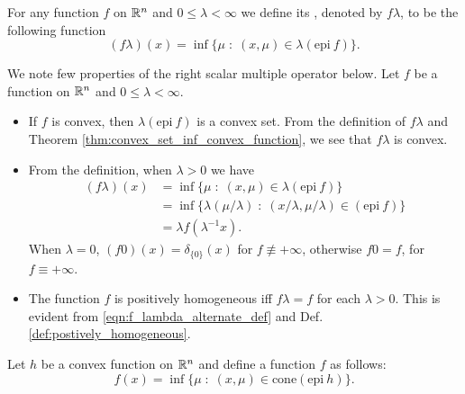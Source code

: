 \documentclass[11pt,a4paper]{article}
\begin{document}
\begin{definition}
    For any function $f$ on $\mathbb{R}^n$ and $0\le\lambda<\infty$ we define its , denoted by $f\lambda$, to be the following function
    \begin{equation*}
        (f\lambda)(x) = \inf\{\mu\;:\;(x,\mu)\in \lambda (\text{epi}\ f)\}.
    \end{equation*}
\end{definition}

\begin{remark}
    We note few properties of the right scalar multiple operator below. Let $f$ be a function on $\mathbb{R}^n$ and $0\le\lambda<\infty$.
    \begin{itemize}
        \item If $f$ is convex, then $\lambda(\text{epi}\ f)$ is a convex set. From the definition of $f\lambda$ and Theorem \ref{thm:convex_set_inf_convex_function}, we see that $f\lambda$ is convex. 
        \item From the definition, when $\lambda>0$ we have
        \begin{align}
            (f\lambda)(x) &= \inf\{\mu\;:\;(x,\mu)\in \lambda (\text{epi}\ f)\} \nonumber\\
            &= \inf\{\lambda (\mu/\lambda)\;:\;(x/\lambda,\mu/\lambda)\in (\text{epi}\ f)\}\nonumber\\
            &= \lambda f(\lambda^{-1}x).\label{eqn:f_lambda_alternate_def}
        \end{align}
        When $\lambda = 0$, $(f0)(x) = \delta_{\{0\}}(x)$ for $f\not\equiv +\infty$, otherwise $f0 = f$, for $f\equiv +\infty$.
        \item The function $f$ is positively homogeneous iff $f\lambda = f$ for each $\lambda>0$. This is evident from \eqref{eqn:f_lambda_alternate_def} and Def. \ref{def:postively_homogeneous}.
    \end{itemize}
\end{remark}

\begin{remark}
    Let $h$ be a convex function on $\mathbb{R}^n$ and define a function $f$ as follows:
    \begin{equation*}
        f(x) = \inf \{\mu\;:\;(x,\mu)\in \text{cone}(\text{epi}\ h)\}.
    \end{equation*}

\end{remark}

\end{document}
